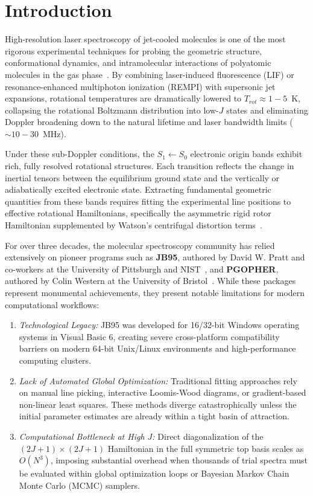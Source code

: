 \documentclass[aps,jcp,reprint,twocolumn,superscriptaddress,showpacs,amsmath,amssymb]{revtex4-2}
\begin{document}
\maketitle

\section{Introduction}
High-resolution laser spectroscopy of jet-cooled molecules is one of the most rigorous experimental techniques for probing the geometric structure, conformational dynamics, and intramolecular interactions of polyatomic molecules in the gas phase~\cite{alvarez2006rotationally,tan2019high}. By combining laser-induced fluorescence (LIF) or resonance-enhanced multiphoton ionization (REMPI) with supersonic jet expansions, rotational temperatures are dramatically lowered to $T_{rot} \approx 1 - 5$~K, collapsing the rotational Boltzmann distribution into low-$J$ states and eliminating Doppler broadening down to the natural lifetime and laser bandwidth limits ($\sim 10 - 30$~MHz).

Under these sub-Doppler conditions, the $S_1 \leftarrow S_0$ electronic origin bands exhibit rich, fully resolved rotational structures. Each transition reflects the change in inertial tensors between the equilibrium ground state and the vertically or adiabatically excited electronic state. Extracting fundamental geometric quantities from these bands requires fitting the experimental line positions to effective rotational Hamiltonians, specifically the asymmetric rigid rotor Hamiltonian supplemented by Watson's centrifugal distortion terms~\cite{watson1977aspects}.

For over three decades, the molecular spectroscopy community has relied extensively on pioneer programs such as \textbf{JB95}, authored by David W. Pratt and co-workers at the University of Pittsburgh and NIST~\cite{alvarez2006rotationally}, and \textbf{PGOPHER}, authored by Colin Western at the University of Bristol~\cite{western2014pgopher}. While these packages represent monumental achievements, they present notable limitations for modern computational workflows:
\begin{enumerate}
    \item \textit{Technological Legacy:} JB95 was developed for 16/32-bit Windows operating systems in Visual Basic 6, creating severe cross-platform compatibility barriers on modern 64-bit Unix/Linux environments and high-performance computing clusters.
    \item \textit{Lack of Automated Global Optimization:} Traditional fitting approaches rely on manual line picking, interactive Loomis-Wood diagrams, or gradient-based non-linear least squares. These methods diverge catastrophically unless the initial parameter estimates are already within a tight basin of attraction.
    \item \textit{Computational Bottleneck at High $J$:} Direct diagonalization of the $(2J+1) \times (2J+1)$ Hamiltonian in the full symmetric top basis scales as $O(N^3)$, imposing substantial overhead when thousands of trial spectra must be evaluated within global optimization loops or Bayesian Markov Chain Monte Carlo (MCMC) samplers.
\end{enumerate}
\end{document}
